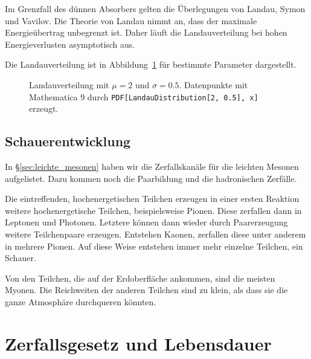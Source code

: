 \documentclass[11pt, ngerman, fleqn, DIV=15, headinclude, BCOR=2cm]{scrreprt}
\begin{document}
Im Grenzfall des dünnen Absorbers gelten die Überlegungen von Landau, Symon und
Vavilov. Die Theorie von Landau nimmt an, dass der maximale Energieübertrag
unbegrenzt ist. Daher läuft die Landauverteilung bei hohen Energieverlusten
asymptotisch aus. \parencite[§2.6.3]{Leo/Techniques_Nuclear_Experiments}

Die Landauverteilung ist in Abbildung~\ref{fig:landau-plot} für bestimmte
Parameter dargestellt.

\begin{figure}[htbp]
    \centering
    \caption{%
        Landauverteilung mit $\mu = \num{2}$ und $\sigma = \num{0.5}$.
        Datenpunkte mit Mathematica 9 durch \texttt{PDF[LandauDistribution[2,
        0.5], x]} erzeugt.
    }
    \label{fig:landau-plot}
\end{figure}

\subsection{Schauerentwicklung}

In §\ref{sec:leichte_mesonen} haben wir die Zerfallskanäle für die leichten
Mesonen aufgelistet. Dazu kommen noch die Paarbildung und die hadronischen
Zerfälle.

Die eintreffenden, hochenergetischen Teilchen erzeugen in einer
ersten Reaktion weitere hochenergetische Teilchen, beispielsweise Pionen. Diese
zerfallen dann in Leptonen und Photonen. Letztere können dann wieder durch
Paarerzeugung weitere Teilchenpaare erzeugen. Entstehen Kaonen, zerfallen diese
unter anderem in mehrere Pionen. Auf diese Weise entstehen immer mehr
einzelne Teilchen, ein Schauer.

Von den Teilchen, die auf der Erdoberfläche ankommen, sind die meisten Myonen.
Die Reichweiten der anderen Teilchen sind zu klein, als dass sie die ganze
Atmosphäre durchqueren könnten. \parencite[110]{Grupen/Astroteilchenphysik}

\section{Zerfallsgesetz und Lebensdauer}
\end{document}
